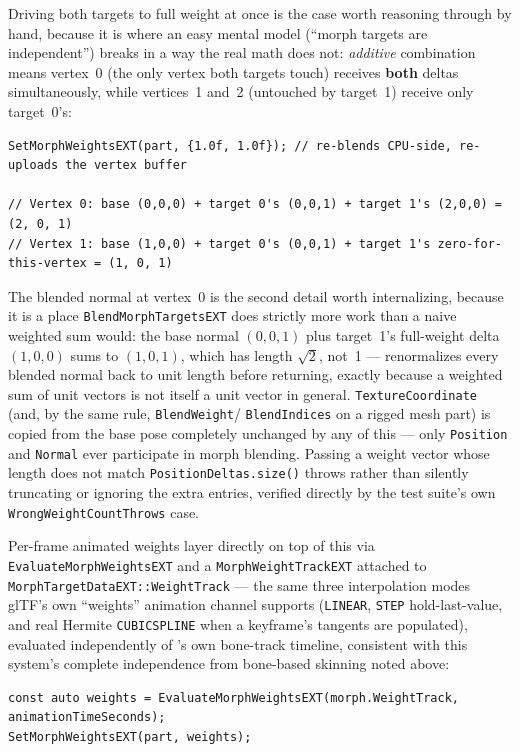 Driving both targets to full weight at once is the case worth reasoning through by hand, because
it is where an easy mental model (``morph targets are independent'') breaks in a way the real
math does not: \emph{additive} combination means vertex~0 (the only vertex both targets touch)
receives \textbf{both} deltas simultaneously, while vertices~1 and~2 (untouched by target~1)
receive only target~0's:

\begin{lstlisting}
SetMorphWeightsEXT(part, {1.0f, 1.0f}); // re-blends CPU-side, re-uploads the vertex buffer

// Vertex 0: base (0,0,0) + target 0's (0,0,1) + target 1's (2,0,0) = (2, 0, 1)
// Vertex 1: base (1,0,0) + target 0's (0,0,1) + target 1's zero-for-this-vertex = (1, 0, 1)
\end{lstlisting}

The blended normal at vertex~0 is the second detail worth internalizing, because it is a place
\texttt{BlendMorphTargetsEXT} does strictly more work than a naive weighted sum would: the base
normal $(0,0,1)$ plus target~1's full-weight delta $(1,0,0)$ sums to $(1,0,1)$, which has length
$\sqrt{2}$, not~1 ---  renormalizes every blended normal back to
unit length before returning, exactly because a weighted sum of unit vectors is not itself a
unit vector in general. \texttt{TextureCoordinate} (and, by the same rule, \texttt{BlendWeight}/
\texttt{BlendIndices} on a rigged mesh part) is copied from the base pose completely unchanged
by any of this --- only \texttt{Position} and \texttt{Normal} ever participate in morph blending.
Passing a weight vector whose length does not match \texttt{PositionDeltas.size()} throws rather
than silently truncating or ignoring the extra entries, verified directly by the test suite's
own \texttt{WrongWeightCountThrows} case.

Per-frame animated weights layer directly on top of this via \texttt{EvaluateMorphWeightsEXT}
and a \texttt{MorphWeightTrackEXT} attached to \texttt{MorphTargetDataEXT::WeightTrack} --- the
same three interpolation modes glTF's own ``weights'' animation channel supports (\texttt{LINEAR},
\texttt{STEP} hold-last-value, and real Hermite \texttt{CUBICSPLINE} when a keyframe's tangents
are populated), evaluated independently of 's own bone-track timeline,
consistent with this system's complete independence from bone-based skinning noted above:

\begin{lstlisting}
const auto weights = EvaluateMorphWeightsEXT(morph.WeightTrack, animationTimeSeconds);
SetMorphWeightsEXT(part, weights);
\end{lstlisting}

